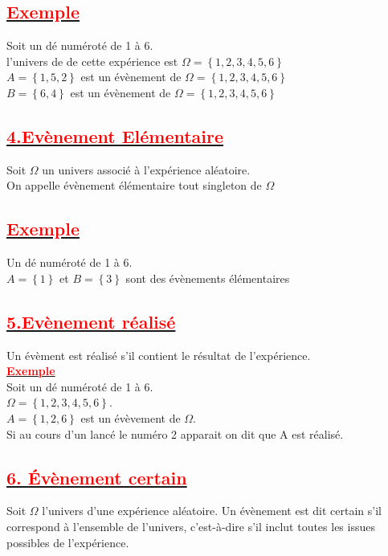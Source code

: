 \documentclass[12pt]{article}
\begin{document}
\subsection*{\underline{\textbf{\textcolor{red}{Exemple}}}}
Soit un dé numéroté de 1 à 6.\\
l'univers de de cette expérience est $\Omega=\left\lbrace 1, 2, 3, 4, 5, 6\right\rbrace$\\
$A=\left\lbrace 1,5,2 \right\rbrace $ est un évènement de $\Omega=\left\lbrace 1, 2, 3, 4, 5, 6\right\rbrace$ \\
$B=\left\lbrace  6,4 \right\rbrace $ est un évènement de $\Omega=\left\lbrace 1, 2, 3, 4, 5, 6\right\rbrace$\\
\subsection*{\underline{\textbf{\textcolor{red}{4.Evènement Elémentaire}}}}
Soit $\Omega$ un univers associé à l'expérience aléatoire.\\
On appelle évènement élémentaire tout singleton de $\Omega$\\
\subsection*{\underline{\textbf{\textcolor{red}{Exemple}}}}
Un dé numéroté de 1 à 6.\\
$A=\left\lbrace 1 \right\rbrace $ et $B=\left\lbrace 3 \right\rbrace $ sont des évènements élémentaires\\
\subsection*{\underline{\textbf{\textcolor{red}{5.Evènement réalisé}}}}
Un évèment est réalisé s'il contient le résultat de l'expérience.\\
\underline{\textbf{\textcolor{red}{Exemple}}}\\
Soit un dé numéroté de 1 à 6.\\
$\Omega = \left\lbrace 1, 2, 3, 4, 5, 6 \right\rbrace $.\\
$A = \left\lbrace 1, 2, 6 \right\rbrace $ est un évèvement de $\Omega$.\\
Si au cours d'un lancé le numéro 2 apparait on dit que A est réalisé.
\subsection*{\underline{\textbf{\textcolor{red}{6. Évènement certain}}}}
Soit $\Omega$ l'univers d'une expérience aléatoire. Un évènement est dit certain s'il correspond à l'ensemble de l'univers, c'est-à-dire s'il inclut toutes les issues possibles de l'expérience.
\end{document}
